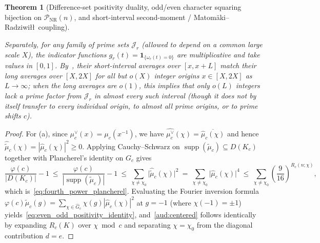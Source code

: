 \documentclass[11pt, a4paper]{article}
\theoremstyle{plain}
\newtheorem{theorem}{Theorem}[section]
\theoremstyle{definition}
\begin{document}
\begin{theorem}[Difference-set positivity duality, odd/even character squaring bijection on $\mathcal{P}_{\mathrm{NR}}(n)$, and short-interval second-moment / Matom\"{a}ki--Radziwi\l\l\ coupling]
\begin{enumerate}[(a)]
    Separately, for any family of prime sets $\mathcal{J}_r$ (allowed to depend on a common large scale $X$), the indicator functions $g_r(t)=\mathbf{1}_{\{\omega_r(t)=0\}}$ are multiplicative and take values in $[0,1]$. By~\cite[Theorem~1]{matomaki_radziwill2016}, their short-interval averages over $[x,x+L]$ match their long averages over $[X,2X]$ for all but $o(X)$ integer origins $x\in[X,2X]$ as $L\to\infty$; when the long averages are $o(1)$, this implies that only $o(L)$ integers lack a prime factor from $\mathcal{J}_r$ in almost every such interval (though it does not by itself transfer to every individual origin, to almost all prime origins, or to prime shifts $c$).
\end{enumerate}
\end{theorem}
\begin{proof}
For (a), since $\mu_c^{\vee}(x)=\mu_c(x^{-1})$, we have $\widehat{\mu_c^{\vee}}(\chi)=\overline{\widehat{\mu}_c(\chi)}$ and hence $\widehat{\widetilde{\mu}}_c(\chi)=|\widehat{\mu}_c(\chi)|^{2}\ge0$. Applying Cauchy--Schwarz on $\operatorname{supp}(\widetilde{\mu}_c)\subseteq D(K_c)$ together with Plancherel's identity on $G_c$ gives
\[
\frac{\varphi(c)}{|D(K_c)|}-1\ \le\ \frac{\varphi(c)}{|\operatorname{supp}(\widetilde{\mu}_c)|}-1\ \le\ \sum_{\chi\neq\chi_0}\big|\widehat{\widetilde{\mu}}_c(\chi)\big|^{2}\ =\ \sum_{\chi\neq\chi_0}\big|\widehat{\mu}_c(\chi)\big|^{4}\ \le\ \sum_{\chi\neq\chi_0}\left(\frac{9}{16}\right)^{R_c(n;\chi)},
\]
which is~\eqref{eq:fourth_power_plancherel}. Evaluating the Fourier inversion formula $\varphi(c)\widetilde{\mu}_c(g)=\sum_{\chi\in\widehat{G}_c}\chi(g)|\widehat{\mu}_c(\chi)|^{2}$ at $g=-1$ (where $\chi(-1)=\pm1$) yields~\eqref{eq:even_odd_positivity_identity}, and~\eqref{aud:centered} follows identically by expanding $R_c(K)$ over $\chi\bmod c$ and separating $\chi=\chi_0$ from the diagonal contribution $d=e$.


\end{proof}
\end{document}
